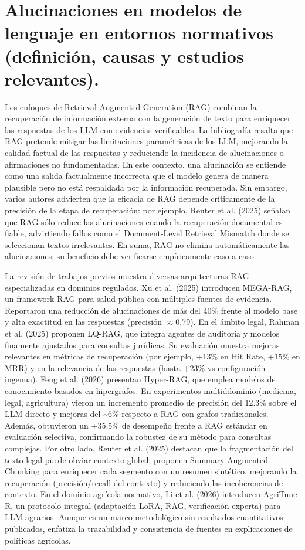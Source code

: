 \section{Alucinaciones en modelos de lenguaje en entornos normativos (definición, causas y estudios relevantes).}
Los enfoques de Retrieval-Augmented Generation (RAG) combinan la recuperación de información externa con la generación de texto para enriquecer las respuestas de los LLM con evidencias verificables. La bibliografía resalta que RAG pretende mitigar las limitaciones paramétricas de los LLM, mejorando la calidad factual de las respuestas y reduciendo la incidencia de alucinaciones o afirmaciones no fundamentadas. En este contexto, una alucinación se entiende como una salida factualmente incorrecta que el modelo genera de manera plausible pero no está respaldada por la información recuperada. Sin embargo, varios autores advierten que la eficacia de RAG depende críticamente de la precisión de la etapa de recuperación: por ejemplo, Reuter et al. (2025) señalan que RAG sólo reduce las alucinaciones cuando la recuperación documental es fiable, advirtiendo fallos como el Document-Level Retrieval Mismatch donde se seleccionan textos irrelevantes. En suma, RAG no elimina automáticamente las alucinaciones; su beneficio debe verificarse empíricamente caso a caso.

La revisión de trabajos previos muestra diversas arquitecturas RAG especializadas en dominios regulados. Xu et al. (2025) introducen MEGA-RAG, un framework RAG para salud pública con múltiples fuentes de evidencia. Reportaron una reducción de alucinaciones de más del 40\% frente al modelo base y alta exactitud en las respuestas (precisión $\approx$0,79). En el ámbito legal, Rahman et al. (2025) proponen LQ-RAG, que integra agentes de auditoría y modelos finamente ajustados para consultas jurídicas. Su evaluación muestra mejoras relevantes en métricas de recuperación (por ejemplo, +13\% en Hit Rate, +15\% en MRR) y en la relevancia de las respuestas (hasta +23\% vs configuración ingenua). Feng et al. (2026) presentan Hyper-RAG, que emplea modelos de conocimiento basados en hipergrafos. En experimentos multiddominio (medicina, legal, agricultura) vieron un incremento promedio de precisión del 12.3\% sobre el LLM directo y mejoras del \textasciitilde{}6\% respecto a RAG con grafos tradicionales. Además, obtuvieron un +35.5\% de desempeño frente a RAG estándar en evaluación selectiva, confirmando la robustez de su método para consultas complejas. Por otro lado, Reuter et al. (2025) destacan que la fragmentación del texto legal puede obviar contexto global; proponen Summary-Augmented Chunking para enriquecer cada segmento con un resumen sintético, mejorando la recuperación (precisión/recall del contexto) y reduciendo las incoherencias de contexto. En el dominio agrícola normativo, Li et al. (2026) introducen AgriTune-R, un protocolo integral (adaptación LoRA, RAG, verificación experta) para LLM agrarios. Aunque es un marco metodológico sin resultados cuantitativos publicados, enfatiza la trazabilidad y consistencia de fuentes en explicaciones de políticas agrícolas.

